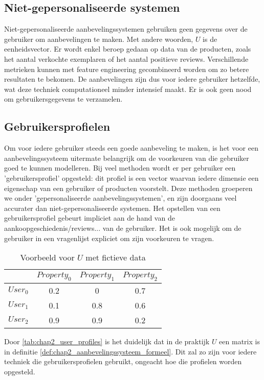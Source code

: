\subsection{Niet-gepersonaliseerde systemen}
\label{sec:chapt2_non_persionalised}
Niet-gepersonaliseerde aanbevelingssystemen gebruiken geen gegevens over de gebruiker om aanbevelingen te maken. Met andere woorden, $U$ is de eenheidsvector. Er wordt enkel beroep gedaan op data van de producten, zoals het aantal verkochte exemplaren of het aantal positieve reviews. Verschillende metrieken kunnen met feature engineering gecombineerd worden om zo betere resultaten te bekomen. De aanbevelingen zijn dus voor iedere gebruiker hetzelfde, wat deze techniek computationeel minder intensief maakt. Er is ook geen nood om gebruikersgegevens te verzamelen.

\subsection{Gebruikersprofielen}
\label{sub:chapt2_gebruikersprofielen}
Om voor iedere gebruiker steeds een goede aanbeveling te maken, is het voor een aanbevelingssysteem uitermate belangrijk om de voorkeuren van die gebruiker goed te kunnen modelleren. Bij veel methoden wordt er per gebruiker een 'gebruikersprofiel' opgesteld: dit profiel is een vector waarvan iedere dimensie een eigenschap van een gebruiker of producten voorstelt. Deze methoden groeperen we onder 'gepersonaliseerde aanbevelingssystemen', en zijn doorgaans veel accurater dan niet-gepersonaliseerde systemen. Het opstellen van een gebruikersprofiel gebeurt impliciet aan de hand van de aankoopgeschiedenis/reviews... van de gebruiker. Het is ook mogelijk om de gebruiker in een vragenlijst expliciet om zijn voorkeuren te vragen.

\begin{table}[H]
\centering
\begin{tabular}{c|ccc}
         & $Property_0$ & $Property_1$ & $Property_2$ \\ \hline
$User_0$ & 0.2          & 0            & 0.7          \\
$User_1$ & 0.1          & 0.8          & 0.6          \\
$User_2$ & 0.9          & 0.9          & 0.2         
\end{tabular}
\caption{Voorbeeld voor $U$ met fictieve data}
\label{tab:chap2_user_profiles}
\end{table}

Door \autoref{tab:chap2_user_profiles} is het duidelijk dat in de praktijk $U$ een matrix is in definitie \ref{def:chap2_aanbevelingssysteem_formeel}. Dit zal zo zijn voor iedere techniek die gebruikersprofielen gebruikt, ongeacht hoe die profielen worden opgesteld.


